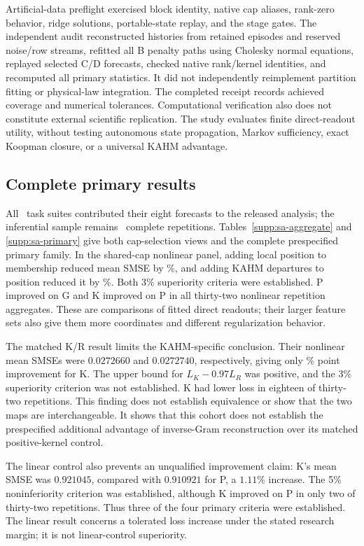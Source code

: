 Artificial-data preflight exercised block identity, native cap aliases,
rank-zero behavior, ridge solutions, portable-state replay, and the stage
gates. The independent audit reconstructed histories from retained
episodes and reserved noise/row streams, refitted all B penalty paths
using Cholesky normal equations, replayed selected C/D forecasts,
checked native rank/kernel identities, and recomputed all primary
statistics. It did not independently reimplement partition fitting or
physical-law integration. The completed receipt records achieved
coverage and numerical tolerances.
Computational verification also does not constitute external scientific
replication. The study evaluates finite direct-readout utility, without
testing autonomous state propagation, Markov sufficiency, exact Koopman
closure, or a universal KAHM advantage.

\FloatBarrier
\subsection{Complete primary results}

All \SATasks\ task suites contributed their eight forecasts to the
released analysis; the inferential sample remains \SARepetitions\
complete repetitions. Tables~\ref{supp:sa-aggregate} and
\ref{supp:sa-primary} give both cap-selection views and the complete
prespecified primary family. In the shared-cap nonlinear panel, adding
local position to membership reduced mean SMSE by \SAGainPG\%, and
adding KAHM departures to position reduced it by \SAGainKP\%.
Both 3\% superiority criteria were established. P improved on G and
K improved on P in all thirty-two nonlinear repetition aggregates.
These are comparisons of fitted direct readouts; their larger feature
sets also give them more coordinates and different regularization
behavior.

The matched K/R result limits the KAHM-specific conclusion. Their
nonlinear mean SMSEs were $0.0272660$ and $0.0272740$, respectively,
giving only \SAGainKR\% point improvement for K. The upper bound for
$L_K-0.97L_R$ was positive, and the 3\% superiority criterion was not
established. K had lower loss in eighteen of thirty-two repetitions.
This finding does not establish equivalence or show that the two maps
are interchangeable. It shows that this cohort does not establish the
prespecified additional advantage of inverse-Gram reconstruction over
its matched positive-kernel control.

The linear control also prevents an unqualified improvement claim:
K's mean SMSE was $0.921045$, compared with $0.910921$ for P, a
$1.11\%$ increase. The 5\% noninferiority criterion was established,
although K improved on P in only two of thirty-two repetitions.
Thus three of the four primary criteria were established. The linear
result concerns a tolerated loss increase under the stated research
margin; it is not linear-control superiority.

